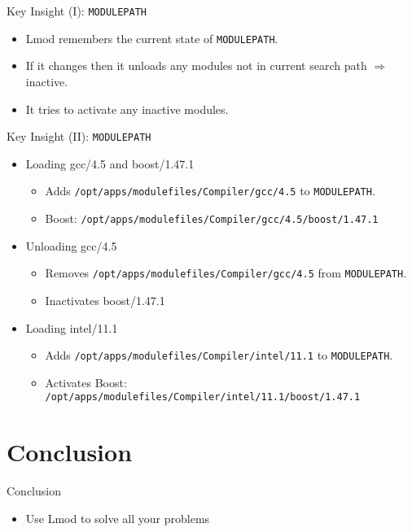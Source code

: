\documentclass{beamer}
\begin{document}
\begin{frame}{Key Insight (I): \texttt{MODULEPATH}}
  \begin{itemize}
    \item Lmod remembers the current state of \texttt{MODULEPATH}.
    \item If it changes then it unloads any modules not in current
      search path $\Rightarrow$ inactive.
    \item It tries to activate any inactive modules.
  \end{itemize}
\end{frame}

\begin{frame}{Key Insight (II): \texttt{MODULEPATH}}
  \begin{itemize}
    \item Loading gcc/4.5 and boost/1.47.1
      \begin{itemize}
        \item Adds \texttt{/opt/apps/modulefiles/Compiler/gcc/4.5} to
          \texttt{MODULEPATH}.
        \item Boost: \texttt{/opt/apps/modulefiles/Compiler/gcc/4.5/boost/1.47.1}
      \end{itemize}
    \item Unloading gcc/4.5
      \begin{itemize}
        \item Removes \texttt{/opt/apps/modulefiles/Compiler/gcc/4.5}
          from \texttt{MODULEPATH}.
        \item Inactivates boost/1.47.1
      \end{itemize}
    \item Loading intel/11.1
      \begin{itemize}
        \item Adds \texttt{/opt/apps/modulefiles/Compiler/intel/11.1} to
          \texttt{MODULEPATH}.
        \item Activates Boost: \texttt{/opt/apps/modulefiles/Compiler/intel/11.1/boost/1.47.1}
      \end{itemize}
  \end{itemize}
\end{frame}





\section{Conclusion}

\begin{frame}{Conclusion}
  \begin{itemize}
    \item Use Lmod to solve all your problems
  \end{itemize}
\end{frame}
\end{document}
